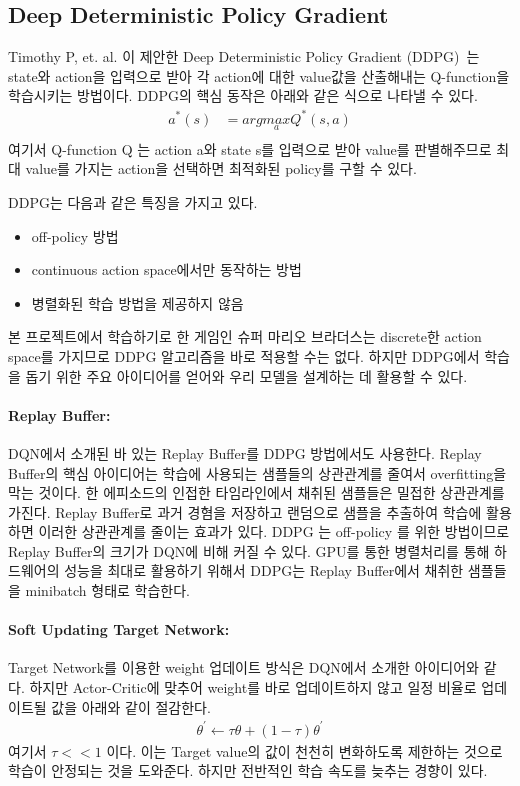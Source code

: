 \subsection{Deep Deterministic Policy Gradient}
Timothy P, et. al. 이 제안한 Deep Deterministic Policy Gradient (DDPG)~\cite{DDPG}는 state와 action을 입력으로 받아 각 action에 대한 value값을 산출해내는 Q-function을 학습시키는 방법이다.
DDPG의 핵심 동작은 아래와 같은 식으로 나타낼 수 있다.
\begin{align*}
	a^*(s) &= arg \underset{a}{max} Q^*(s,a) \\
\end{align*}
여기서 Q-function Q 는 action a와 state s를 입력으로 받아 value를 판별해주므로 최대 value를 가지는 action을 선택하면 최적화된 policy를 구할 수 있다.

DDPG는 다음과 같은 특징을 가지고 있다.
\begin{itemize}
	\item off-policy 방법
	\item continuous action space에서만 동작하는 방법
	\item 병렬화된 학습 방법을 제공하지 않음
\end{itemize}
본 프로젝트에서 학습하기로 한 게임인 슈퍼 마리오 브라더스는 discrete한 action space를 가지므로 DDPG 알고리즘을 바로 적용할 수는 없다.
하지만 DDPG에서 학습을 돕기 위한 주요 아이디어를 얻어와 우리 모델을 설계하는 데 활용할 수 있다.

\paragraph{\textbf{Replay Buffer:}}
DQN에서 소개된 바 있는 Replay Buffer를 DDPG 방법에서도 사용한다.
Replay Buffer의 핵심 아이디어는 학습에 사용되는 샘플들의 상관관계를 줄여서 overfitting을 막는 것이다.
한 에피소드의 인접한 타임라인에서 채취된 샘플들은 밀접한 상관관계를 가진다.
Replay Buffer로 과거 경혐을 저장하고 랜덤으로 샘플을 추출하여 학습에 활용하면 이러한 상관관계를 줄이는 효과가 있다.
DDPG 는 off-policy 를 위한 방법이므로 Replay Buffer의 크기가 DQN에 비해 커질 수 있다.
GPU를 통한 병렬처리를 통해 하드웨어의 성능을 최대로 활용하기 위해서 DDPG는 Replay Buffer에서 채취한 샘플들을 minibatch 형태로 학습한다.
\paragraph{\textbf{Soft Updating Target Network:}}
Target Network를 이용한 weight 업데이트 방식은 DQN에서 소개한 아이디어와 같다.
하지만 Actor-Critic에 맞추어 weight를 바로 업데이트하지 않고 일정 비율로 업데이트될 값을 아래와 같이 절감한다.
\begin{align*}
	\theta^{'} \leftarrow \tau\theta + (1 - \tau)\theta^{'}
\end{align*}
여기서 $\tau << 1$ 이다.
이는 Target value의 값이 천천히 변화하도록 제한하는 것으로 학습이 안정되는 것을 도와준다.
하지만 전반적인 학습 속도를 늦추는 경향이 있다.

